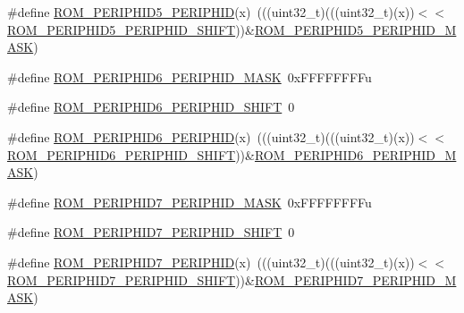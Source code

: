 \begin{DoxyCompactItemize}
\item 
\#define \hyperlink{group___r_o_m___register___masks_gaa801210cd537086eddf2456575251d93}{R\+O\+M\+\_\+\+P\+E\+R\+I\+P\+H\+I\+D5\+\_\+\+P\+E\+R\+I\+P\+H\+ID}(x)~(((uint32\+\_\+t)(((uint32\+\_\+t)(x))$<$$<$\hyperlink{group___r_o_m___register___masks_ga083194b41cf1109fe5a6e235b2c1f89a}{R\+O\+M\+\_\+\+P\+E\+R\+I\+P\+H\+I\+D5\+\_\+\+P\+E\+R\+I\+P\+H\+I\+D\+\_\+\+S\+H\+I\+FT}))\&\hyperlink{group___r_o_m___register___masks_ga39e8a3441c79c42651efba9100e653a7}{R\+O\+M\+\_\+\+P\+E\+R\+I\+P\+H\+I\+D5\+\_\+\+P\+E\+R\+I\+P\+H\+I\+D\+\_\+\+M\+A\+SK})
\item 
\#define \hyperlink{group___r_o_m___register___masks_gae29765428defa80237980d34b67f4fde}{R\+O\+M\+\_\+\+P\+E\+R\+I\+P\+H\+I\+D6\+\_\+\+P\+E\+R\+I\+P\+H\+I\+D\+\_\+\+M\+A\+SK}~0x\+F\+F\+F\+F\+F\+F\+F\+Fu
\item 
\#define \hyperlink{group___r_o_m___register___masks_ga0cb9b85e1ca798d1897bcef6afce8a79}{R\+O\+M\+\_\+\+P\+E\+R\+I\+P\+H\+I\+D6\+\_\+\+P\+E\+R\+I\+P\+H\+I\+D\+\_\+\+S\+H\+I\+FT}~0
\item 
\#define \hyperlink{group___r_o_m___register___masks_gacd2a1a4b870a765537be3a9aaae25cba}{R\+O\+M\+\_\+\+P\+E\+R\+I\+P\+H\+I\+D6\+\_\+\+P\+E\+R\+I\+P\+H\+ID}(x)~(((uint32\+\_\+t)(((uint32\+\_\+t)(x))$<$$<$\hyperlink{group___r_o_m___register___masks_ga0cb9b85e1ca798d1897bcef6afce8a79}{R\+O\+M\+\_\+\+P\+E\+R\+I\+P\+H\+I\+D6\+\_\+\+P\+E\+R\+I\+P\+H\+I\+D\+\_\+\+S\+H\+I\+FT}))\&\hyperlink{group___r_o_m___register___masks_gae29765428defa80237980d34b67f4fde}{R\+O\+M\+\_\+\+P\+E\+R\+I\+P\+H\+I\+D6\+\_\+\+P\+E\+R\+I\+P\+H\+I\+D\+\_\+\+M\+A\+SK})
\item 
\#define \hyperlink{group___r_o_m___register___masks_ga46d62ff696136480044fa6bd78597be6}{R\+O\+M\+\_\+\+P\+E\+R\+I\+P\+H\+I\+D7\+\_\+\+P\+E\+R\+I\+P\+H\+I\+D\+\_\+\+M\+A\+SK}~0x\+F\+F\+F\+F\+F\+F\+F\+Fu
\item 
\#define \hyperlink{group___r_o_m___register___masks_ga660f3354bf252cb5c5a72b828ba683bd}{R\+O\+M\+\_\+\+P\+E\+R\+I\+P\+H\+I\+D7\+\_\+\+P\+E\+R\+I\+P\+H\+I\+D\+\_\+\+S\+H\+I\+FT}~0
\item 
\#define \hyperlink{group___r_o_m___register___masks_ga954df1566228d34b0f016073d865e878}{R\+O\+M\+\_\+\+P\+E\+R\+I\+P\+H\+I\+D7\+\_\+\+P\+E\+R\+I\+P\+H\+ID}(x)~(((uint32\+\_\+t)(((uint32\+\_\+t)(x))$<$$<$\hyperlink{group___r_o_m___register___masks_ga660f3354bf252cb5c5a72b828ba683bd}{R\+O\+M\+\_\+\+P\+E\+R\+I\+P\+H\+I\+D7\+\_\+\+P\+E\+R\+I\+P\+H\+I\+D\+\_\+\+S\+H\+I\+FT}))\&\hyperlink{group___r_o_m___register___masks_ga46d62ff696136480044fa6bd78597be6}{R\+O\+M\+\_\+\+P\+E\+R\+I\+P\+H\+I\+D7\+\_\+\+P\+E\+R\+I\+P\+H\+I\+D\+\_\+\+M\+A\+SK})
$$
\end{DoxyCompactItemize}
